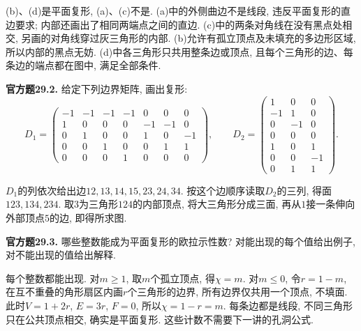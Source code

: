 \begin{solution}
(b)、(d)是平面复形, (a)、(c)不是. (a)中的外侧曲边不是线段, 违反平面复形的直边要求; 内部还画出了相同两端点之间的直边. (c)中的两条对角线在没有黑点处相交, 另画的对角线穿过灰三角形的内部. (b)允许有孤立顶点及未填充的多边形区域, 所以内部的黑点无妨. (d)中各三角形只共用整条边或顶点, 且每个三角形的边、每条边的端点都在图中, 满足全部条件.
\end{solution}

\begin{exercise}\label{cq:29.2}
\textbf{官方题29.2.} 给定下列边界矩阵, 画出复形:
\[
D_1=\begin{pmatrix}
-1&-1&-1&-1&0&0&0\\
1&0&0&0&-1&-1&0\\
0&1&0&0&1&0&-1\\
0&0&1&0&0&1&1\\
0&0&0&1&0&0&0
\end{pmatrix},\qquad
D_2=\begin{pmatrix}
1&0&0\\-1&1&0\\0&-1&0\\0&0&0\\1&0&1\\0&0&-1\\0&1&1
\end{pmatrix}.
\]
\end{exercise}
\begin{solution}
$D_1$的列依次给出边$12,13,14,15,23,24,34$. 按这个边顺序读取$D_2$的三列, 得面$123,134,234$. 取$3$为三角形$124$的内部顶点, 将大三角形分成三面, 再从$1$接一条伸向外部顶点$5$的边, 即得所求图.
\begin{center}
\end{center}
\end{solution}

\begin{exercise}\label{cq:29.3}
\textbf{官方题29.3.} 哪些整数能成为平面复形的欧拉示性数? 对能出现的每个值给出例子, 对不能出现的值给出解释.
\end{exercise}
\begin{solution}
每个整数都能出现. 对$m\ge1$, 取$m$个孤立顶点, 得$\chi=m$. 对$m\le0$, 令$r=1-m$, 在互不重叠的角形扇区内画$r$个三角形的边界, 所有边界仅共用一个顶点, 不填面. 此时$V=1+2r$, $E=3r$, $F=0$, 所以$\chi=1-r=m$. 每条边都是线段, 不同三角形只在公共顶点相交, 确实是平面复形. 这些计数不需要下一讲的孔洞公式.
\end{solution}

